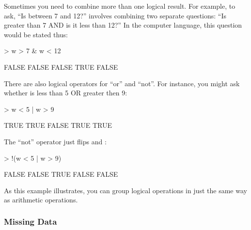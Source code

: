 Sometimes you need to combine more than one logical result.  For
example, to ask, ``Is  between 7 and 12?'' involves combining
two separate questions: ``Is  greater than 7 AND
is it less than 12?''  In the computer language, this question would
be stated thus:
\begin{Schunk}
\begin{Sinput}
> w > 7 & w < 12
\end{Sinput}
\begin{Soutput}
[1] FALSE FALSE FALSE  TRUE FALSE
\end{Soutput}
\end{Schunk}

There are also logical operators for ``or'' and ``not''.  For
instance, you might ask whether  is less than 5 OR greater
then 9:
\begin{Schunk}
\begin{Sinput}
> w < 5 | w > 9
\end{Sinput}
\begin{Soutput}
[1]  TRUE  TRUE FALSE  TRUE  TRUE
\end{Soutput}
\end{Schunk}
The ``not'' operator just flips  and :
\begin{Schunk}
\begin{Sinput}
> !(w < 5 | w > 9)
\end{Sinput}
\begin{Soutput}
[1] FALSE FALSE  TRUE FALSE FALSE
\end{Soutput}
\end{Schunk}
As this example illustrates, you can group logical operations in just
the same way as arithmetic operations. 



\subsubsection{Missing Data}

